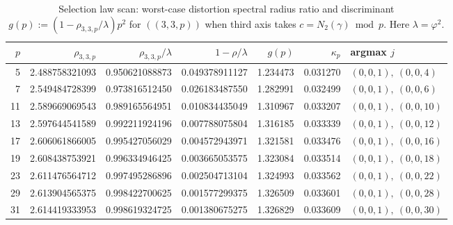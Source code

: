 \begin{table}[H]
\centering
\scriptsize
\setlength{\tabcolsep}{6pt}
\caption{Selection law scan: worst-case distortion spectral radius ratio and discriminant $g(p):=(1-\rho_{3,3,p}/\lambda)p^2$ for $((3,3,p))$ when third axis takes $c=N_2(\gamma)\bmod p$. Here $\lambda=\varphi^2$.}
\label{tab:real_input_40_arity_335_n2_selection_law_primes}
\begin{tabular}{r r r r r r l}
\toprule
$p$ & $\rho_{3,3,p}$ & $\rho_{3,3,p}/\lambda$ & $1-\rho/\lambda$ & $g(p)$ & $\kappa_p$ & argmax $j$\\
\midrule
5 & 2.488758321093 & 0.950621088873 & 0.049378911127 & 1.234473 & 0.031270 & $(0,0,1),\ (0,0,4)$\\
7 & 2.549484728399 & 0.973816512450 & 0.026183487550 & 1.282991 & 0.032499 & $(0,0,1),\ (0,0,6)$\\
11 & 2.589669069543 & 0.989165564951 & 0.010834435049 & 1.310967 & 0.033207 & $(0,0,1),\ (0,0,10)$\\
13 & 2.597644541589 & 0.992211924196 & 0.007788075804 & 1.316185 & 0.033339 & $(0,0,1),\ (0,0,12)$\\
17 & 2.606061866005 & 0.995427056029 & 0.004572943971 & 1.321581 & 0.033476 & $(0,0,1),\ (0,0,16)$\\
19 & 2.608438753921 & 0.996334946425 & 0.003665053575 & 1.323084 & 0.033514 & $(0,0,1),\ (0,0,18)$\\
23 & 2.611476564712 & 0.997495286896 & 0.002504713104 & 1.324993 & 0.033562 & $(0,0,1),\ (0,0,22)$\\
29 & 2.613904565375 & 0.998422700625 & 0.001577299375 & 1.326509 & 0.033601 & $(0,0,1),\ (0,0,28)$\\
31 & 2.614419333953 & 0.998619324725 & 0.001380675275 & 1.326829 & 0.033609 & $(0,0,1),\ (0,0,30)$\\
\bottomrule
\end{tabular}
\end{table}
